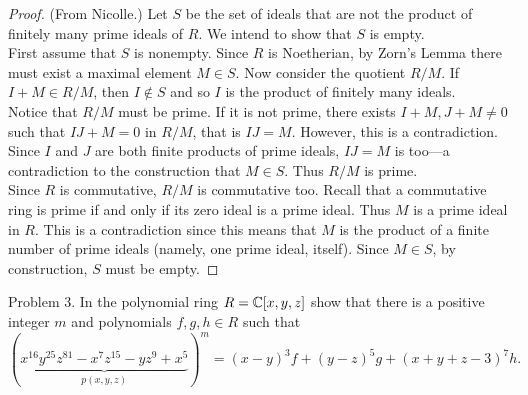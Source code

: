 \documentclass{article}
\begin{document}
\begin{proof}(From Nicolle.)
  Let $S$ be the set of ideals that are not the product of finitely many prime
  ideals of $R$. We intend to show that $S$ is empty.
  \\

  First assume that $S$ is nonempty. Since $R$ is Noetherian, by Zorn's Lemma there must exist a
  maximal element $M \in S$.
  Now consider the quotient $R/M$. If $I + M \in R/M$, then $I \not\in S$
  and so $I$ is the product of finitely many ideals.
  \\

  Notice that $R/M$ must be prime. If it is not prime, there exists
    $I + M, J + M \neq 0$ such that $IJ + M = 0$ in $R/M$, that is $IJ = M$.
    However, this is a contradiction. Since $I$ and $J$ are both finite products
    of prime ideals, $IJ = M$ is too---a contradiction to the construction that
    $M \in S$. Thus $R/M$ is prime.
  \\
  
  Since $R$ is commutative, $R/M$ is commutative too. Recall that a commutative ring is prime if and only if its zero ideal is a prime ideal. Thus $M$ is a prime ideal in $R$. This is a contradiction since this means that $M$ is the product of a finite number of prime ideals (namely, one prime ideal, itself).
  Since $M \in S$, by construction, $S$ must be empty.
\end{proof}
\pagebreak

\begin{subsection}{Problem 3.}
  In the polynomial ring $R = \mathbb C[x,y,z]$ show that there is a positive integer $m$ and polynomials $f,g,h \in R$ such that \[
    (\underbrace{x^{16}y^{25}z^{81} - x^{7}z^{15} - yz^{9} + x^5}_{p(x,y,z)})^m =
    (x - y)^3f +
    (y - z)^5g +
    (x + y + z - 3)^7h.
  \]
\end{subsection}
\end{document}
